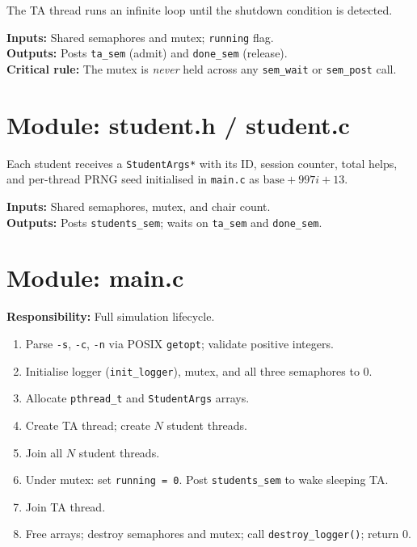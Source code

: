 \documentclass[12pt,a4paper]{report}
\begin{document}
The TA thread runs an infinite loop until the shutdown condition is detected.

\textbf{Inputs:} Shared semaphores and mutex; \texttt{running} flag.\\
\textbf{Outputs:} Posts \texttt{ta\_sem} (admit) and \texttt{done\_sem} (release).\\
\textbf{Critical rule:} The mutex is \emph{never} held across any \texttt{sem\_wait} or
\texttt{sem\_post} call.

\section{Module: student.h / student.c}

Each student receives a \texttt{StudentArgs*} with its ID, session counter, total helps, and
per-thread PRNG seed initialised in \texttt{main.c} as $\text{base} + 997i + 13$.

\textbf{Inputs:} Shared semaphores, mutex, and chair count.\\
\textbf{Outputs:} Posts \texttt{students\_sem}; waits on \texttt{ta\_sem} and
\texttt{done\_sem}.

\section{Module: main.c}

\textbf{Responsibility:} Full simulation lifecycle.

\begin{enumerate}[leftmargin=2em,itemsep=1pt]
  \item Parse \texttt{-s}, \texttt{-c}, \texttt{-n} via POSIX \texttt{getopt}; validate positive integers.
  \item Initialise logger (\texttt{init\_logger}), mutex, and all three semaphores to 0.
  \item Allocate \texttt{pthread\_t} and \texttt{StudentArgs} arrays.
  \item Create TA thread; create $N$ student threads.
  \item Join all $N$ student threads.
  \item Under mutex: set \texttt{running = 0}. Post \texttt{students\_sem} to wake sleeping TA.
  \item Join TA thread.
  \item Free arrays; destroy semaphores and mutex; call \texttt{destroy\_logger()}; return 0.
\end{enumerate}
\end{document}
